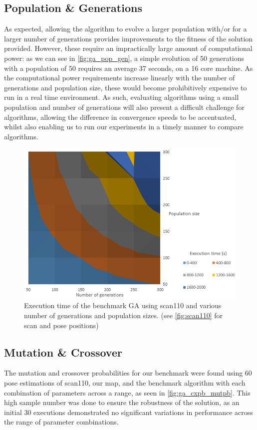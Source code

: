 \documentclass[authoryearcitations]{UoYCSproject}
\begin{document}
\subsection{Population \& Generations}
As expected, allowing the algorithm to evolve a larger population with/or for a larger number of generations provides improvements to the fitness of the solution provided. However, these require an impractically large amount of computational power: as we can see in \autoref{fig:ga_pop_gen}, a simple evolution of 50 generations with a population of 50 requires an average 37 seconds, on a 16 core machine. As the computational power requirements increase linearly with the number of generations and population size, these would become prohibitively expensive to run in a real time environment. As such, evaluating algorithms using a small population and number of generations will also present a difficult challenge for algorithms, allowing the difference in convergence speeds to be accentuated, whilst also enabling us to run our experiments in a timely manner to compare algorithms. 
\begin{figure}[ht]
\centering
	\includegraphics[width=\textwidth,keepaspectratio]{images/ga_pop_gen_sweep.png}
	\caption{Execution time of the benchmark GA using scan110 and various number of generations and population sizes. (see \autoref{fig:scan110} for scan and pose positions)}
	\label{fig:ga_pop_gen}
\end{figure}

\subsection{Mutation \& Crossover}
\label{subsec:benchmark_mutpb_cxpb}
The mutation and crossover probabilities for our benchmark were found using 60 pose estimations of scan110, our map, and the benchmark algorithm with each combination of parameters across a range, as seen in \autoref{fig:ga_cxpb_mutpb}. This high sample number was done to ensure the robustness of the solution, as an initial 30 executions demonstrated no significant variations in performance across the range of parameter combinations. 
\end{document}
